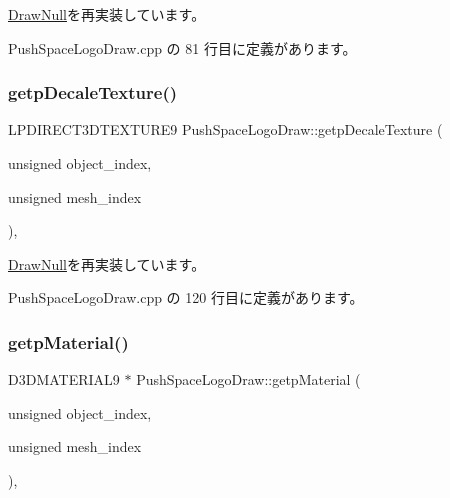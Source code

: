 \mbox{\hyperlink{class_draw_null_a7586cc78eed6bcaf2972ad7a6a70e665}{Draw\+Null}}を再実装しています。



 Push\+Space\+Logo\+Draw.\+cpp の 81 行目に定義があります。

\mbox{\label{class_push_space_logo_draw_abfba58752543d8b2ccfe1e4003032dd3}} 
\subsubsection{\texorpdfstring{getp\+Decale\+Texture()}{getpDecaleTexture()}}
{\footnotesize\ttfamily L\+P\+D\+I\+R\+E\+C\+T3\+D\+T\+E\+X\+T\+U\+R\+E9 Push\+Space\+Logo\+Draw\+::getp\+Decale\+Texture (\begin{DoxyParamCaption}\item[{unsigned}]{object\+\_\+index,  }\item[{unsigned}]{mesh\+\_\+index }\end{DoxyParamCaption})\hspace{0.3cm}{\ttfamily [override]}, {\ttfamily [virtual]}}



\mbox{\hyperlink{class_draw_null_a2dfa2d2cbb66249f933420a38e9cadad}{Draw\+Null}}を再実装しています。



 Push\+Space\+Logo\+Draw.\+cpp の 120 行目に定義があります。

\mbox{\label{class_push_space_logo_draw_a4dc41e6b1afece431f3c321145abe541}} 
\subsubsection{\texorpdfstring{getp\+Material()}{getpMaterial()}}
{\footnotesize\ttfamily D3\+D\+M\+A\+T\+E\+R\+I\+A\+L9 $\ast$ Push\+Space\+Logo\+Draw\+::getp\+Material (\begin{DoxyParamCaption}\item[{unsigned}]{object\+\_\+index,  }\item[{unsigned}]{mesh\+\_\+index }\end{DoxyParamCaption})\hspace{0.3cm}{\ttfamily [override]}, {\ttfamily [virtual]}}



